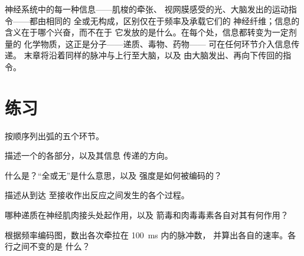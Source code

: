 \begin{remark}[由相同脉冲构成的信息]\label{rem:g12:stretch-reflex:spikes}
神经系统中的每一种信息——肌梭的牵张、
视网膜感受的光、大脑发出的运动指令——都由相同的
全或无构成，区别仅在于频率及承载它们的
神经纤维；信息的含义在于哪个兴奋，而不在于
它发放的是什么。在每个处，信息都转变为一定剂量的
化学物质，这正是分子——递质、毒物、药物——
可在任何环节介入信息传递。
末章将沿着同样的脉冲与上行至大脑，以及
由大脑发出、再向下传回的指令。
\end{remark}

\section{练习}

\begin{exercise}[$\star$]\label{exo:g12:stretch-reflex:1}
按顺序列出弧的五个环节。
\end{exercise}

\begin{exercise}[$\star$]\label{exo:g12:stretch-reflex:2}
描述一个的各部分，以及其信息
传递的方向。
\end{exercise}

\begin{exercise}[$\star$]\label{exo:g12:stretch-reflex:3}
什么是？“全或无”是什么意思，以及
强度是如何被编码的？
\end{exercise}

\begin{exercise}[$\star$]\label{exo:g12:stretch-reflex:4}
描述从到达
至接收作出反应之间发生的各个过程。
\end{exercise}

\begin{exercise}[$\star$]\label{exo:g12:stretch-reflex:5}
哪种递质在神经肌肉接头处起作用，以及
箭毒和肉毒毒素各自对其有何作用？
\end{exercise}

\begin{exercise}[$\star\star$]\label{exo:g12:stretch-reflex:6}
根据频率编码图，数出各次牵拉在 \qty{100}{ms} 内的脉冲数，
并算出各自的速率。各行之间不变的是
什么？
\end{exercise}

